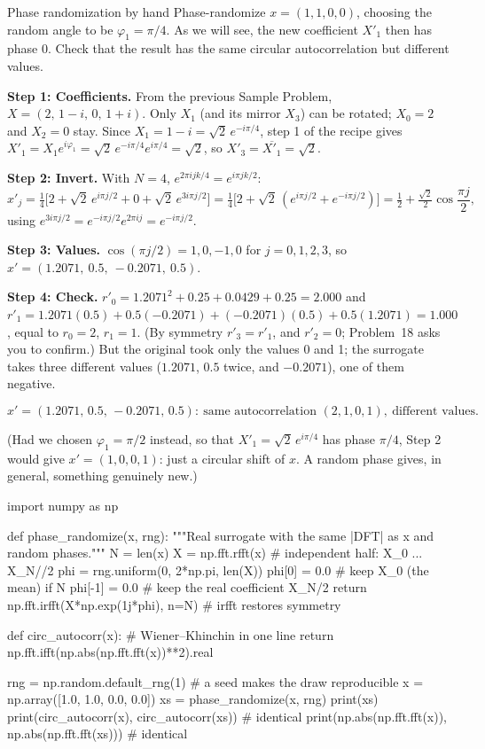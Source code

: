 \begin{sample}{Phase randomization by hand}
Phase-randomize $x=(1,1,0,0)$, choosing the random angle to be $\varphi_1=\pi/4$. As we will see, the new coefficient $X'_1$ then has phase $0$. Check that the result has the same circular autocorrelation but different values.

\textbf{Step 1: Coefficients.} From the previous Sample Problem, $X=(2,\,1-i,\,0,\,1+i)$. Only $X_1$ (and its mirror $X_3$) can be rotated; $X_0=2$ and $X_2=0$ stay. Since $X_1=1-i=\sqrt2\,e^{-i\pi/4}$, step 1 of the recipe gives $X'_1=X_1e^{i\varphi_1}=\sqrt2\,e^{-i\pi/4}e^{i\pi/4}=\sqrt2$, so $X'_3=\overline{X'_1}=\sqrt2$.

\textbf{Step 2: Invert.} With $N=4$, $e^{2\pi ijk/4}=e^{i\pi jk/2}$:
\[x'_j=\tfrac14\bigl[2+\sqrt2\,e^{i\pi j/2}+0+\sqrt2\,e^{3i\pi j/2}\bigr]=\tfrac14\bigl[2+\sqrt2\,(e^{i\pi j/2}+e^{-i\pi j/2})\bigr]=\tfrac12+\tfrac{\sqrt2}{2}\cos\frac{\pi j}{2},\]
using $e^{3i\pi j/2}=e^{-i\pi j/2}e^{2\pi ij}=e^{-i\pi j/2}$.

\textbf{Step 3: Values.} $\cos(\pi j/2)=1,0,-1,0$ for $j=0,1,2,3$, so $x'=(1.2071,\ 0.5,\ -0.2071,\ 0.5)$.

\textbf{Step 4: Check.} $r'_0=1.2071^2+0.25+0.0429+0.25=2.000$ and $r'_1=1.2071(0.5)+0.5(-0.2071)+(-0.2071)(0.5)+0.5(1.2071)=1.000$, equal to $r_0=2$, $r_1=1$. (By symmetry $r'_3=r'_1$, and $r'_2=0$; Problem~18 asks you to confirm.) But the original took only the values 0 and 1; the surrogate takes three different values ($1.2071$, $0.5$ twice, and $-0.2071$), one of them negative.

\[\boxed{x'=(1.2071,\,0.5,\,-0.2071,\,0.5):\ \text{same autocorrelation }(2,1,0,1),\ \text{different values}.}\]
\end{sample}

(Had we chosen $\varphi_1=\pi/2$ instead, so that $X'_1=\sqrt2\,e^{i\pi/4}$ has phase $\pi/4$, Step 2 would give $x'=(1,0,0,1)$: just a circular shift of $x$. A random phase gives, in general, something genuinely new.)

\begin{pycode}
import numpy as np

def phase_randomize(x, rng):
    """Real surrogate with the same |DFT| as x and random phases."""
    N = len(x)
    X = np.fft.rfft(x)                 # independent half: X_0 ... X_{N//2}
    phi = rng.uniform(0, 2*np.pi, len(X))
    phi[0] = 0.0                       # keep X_0 (the mean)
    if N %
        phi[-1] = 0.0                  # keep the real coefficient X_{N/2}
    return np.fft.irfft(X*np.exp(1j*phi), n=N)   # irfft restores symmetry

def circ_autocorr(x):                  # Wiener--Khinchin in one line
    return np.fft.ifft(np.abs(np.fft.fft(x))**2).real

rng = np.random.default_rng(1)         # a seed makes the draw reproducible
x = np.array([1.0, 1.0, 0.0, 0.0])
xs = phase_randomize(x, rng)
print(xs)
print(circ_autocorr(x), circ_autocorr(xs))           # identical
print(np.abs(np.fft.fft(x)), np.abs(np.fft.fft(xs)))  # identical
\end{pycode}

